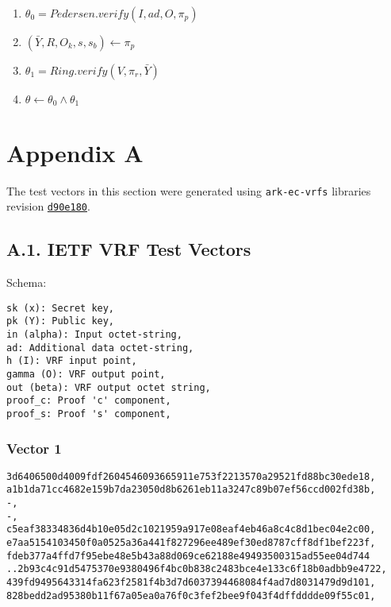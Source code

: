 \documentclass[
]{article}
\providecommand{\tightlist}{%
  \setlength{\itemsep}{0pt}\setlength{\parskip}{0pt}}
\begin{document}
\begin{enumerate}
\def\labelenumi{\arabic{enumi}.}
\tightlist
\item
  \(\theta_0 = Pedersen.verify(I, ad, O, \pi_p)\)
\item
  \((\bar{Y}, R, O_k, s, s_b) \gets \pi_p\)
\item
  \(\theta_1 = Ring.verify(V, \pi_r, \bar{Y})\)
\item
  \(\theta \gets \theta_0 \land \theta_1\)
\end{enumerate}

\section{Appendix A}\label{appendix-a}

The test vectors in this section were generated using
\texttt{ark-ec-vrfs} libraries revision
\href{https://github.com/davxy/ark-ec-vrfs/tree/d90e1800d571f32163e6f7b5d956d065668c899f}{\texttt{d90e180}}.

\subsection{A.1. IETF VRF Test
Vectors}\label{a.1.-ietf-vrf-test-vectors}

Schema:

\begin{verbatim}
sk (x): Secret key,
pk (Y): Public key,
in (alpha): Input octet-string,
ad: Additional data octet-string,
h (I): VRF input point,
gamma (O): VRF output point,
out (beta): VRF output octet string,
proof_c: Proof 'c' component,
proof_s: Proof 's' component,
\end{verbatim}

\subsubsection{Vector 1}\label{vector-1}

\begin{verbatim}
3d6406500d4009fdf2604546093665911e753f2213570a29521fd88bc30ede18,
a1b1da71cc4682e159b7da23050d8b6261eb11a3247c89b07ef56ccd002fd38b,
-,
-,
c5eaf38334836d4b10e05d2c1021959a917e08eaf4eb46a8c4c8d1bec04e2c00,
e7aa5154103450f0a0525a36a441f827296ee489ef30ed8787cff8df1bef223f,
fdeb377a4ffd7f95ebe48e5b43a88d069ce62188e49493500315ad55ee04d744
..2b93c4c91d5475370e9380496f4bc0b838c2483bce4e133c6f18b0adbb9e4722,
439fd9495643314fa623f2581f4b3d7d6037394468084f4ad7d8031479d9d101,
828bedd2ad95380b11f67a05ea0a76f0c3fef2bee9f043f4dffdddde09f55c01,
\end{verbatim}
\end{document}
